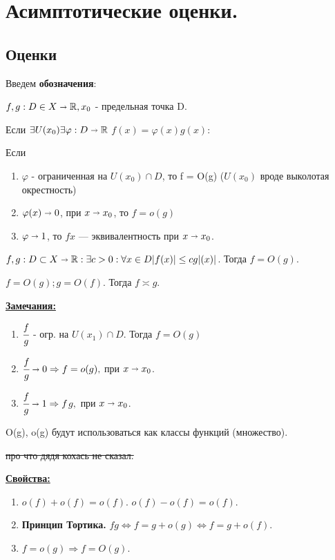 \documentclass{article}
\newcommand{\deff}[1]{\underline{\textbf{#1}}}
\newcommand{\mytilde}{\raisebox{0.5ex}{\texttildelow}}
\begin{document}
   
\pagebreak
\section{Асимптотические оценки.}

\subsection{Оценки}
Введем \textbf{обозначения}:


$f,g: D \in X \shortrightarrow \mathbb{R}, x_0$ - предельная точка D.

Если $\exists U(x_0) \exists \varphi: D \shortrightarrow \mathbb{R}$ $f(x) = \varphi(x)g(x)$:

Если
\begin{enumerate}
    \item $\varphi$ - ограниченная на $U(x_0) \cap D$, то f = O(g) ($U(x_0)$ вроде выколотая окрестность)
    \item $\varphi(x) \shortrightarrow 0$, при $x\shortrightarrow x_0$, то $ f = o(g)$
    \item $\varphi \shortrightarrow 1$, то $f $\mytilde$ x$ --- эквивалентность при $x \shortrightarrow x_0$.
\end{enumerate}

$f,g: D \subset X \shortrightarrow \mathbb{R}: \exists c>0: \forall x \in D |f(x)|\leq c g|(x)|$. Тогда $f = O(g)$.

$f = O(g); g = O(f).$ Тогда $f \asymp g$.


\deff{Замечания:}

\begin{enumerate}
    \item $\cfrac{f}{g}$ - огр. на  $U(x_1) \cap D$. Тогда $f = O(g)$
    \item $\cfrac{f}{g}  \shortrightarrow 0 \Rightarrow f= o(g),$ при $x\shortrightarrow x_0$.
    \item $\cfrac{f}{g}  \shortrightarrow 1 \Rightarrow f$\mytilde$g,$ при $x\shortrightarrow x_0$.
\end{enumerate}

O(g), o(g)  будут использоваться как классы функций (множество).

\sout{про что дядя кохась не сказал.}

\deff{Свойства:}
\begin{enumerate}
    \item $o(f) + o(f) = o(f)$. $o(f) - o(f) = o(f)$.
    \item \textbf{Принцип Тортика.} $f$\mytilde$g \Leftrightarrow f = g + o(g)$$\Leftrightarrow f = g + o(f)$.
    \item $f = o(g) \Rightarrow f = O(g)$.
\end{enumerate}
\end{document}
